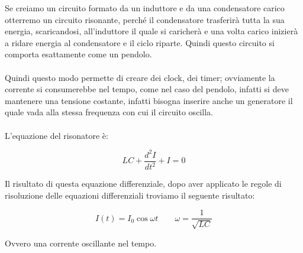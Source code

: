 Se creiamo un circuito formato da un induttore e da una condensatore carico otterremo un circuito risonante, perché il condensatore trasferirà tutta la sua energia, scaricandosi, all'induttore il quale si caricherà e una volta carico inizierà a ridare energia al condensatore e il ciclo riparte. Quindi questo circuito si comporta esattamente come un pendolo.
\paragraph{}
Quindi questo modo permette di creare dei clock, dei timer; ovviamente la corrente si consumerebbe nel tempo, come nel caso del pendolo, infatti si deve mantenere una tensione costante, infatti bisogna inserire anche un generatore il quale vada alla stessa frequenza con cui il circuito oscilla.

\paragraph{}
L'equazione del risonatore è:

\begin{equation}
    LC + \frac{d^2I}{dt^2} + I = 0
\end{equation}

Il risultato di questa equazione differenziale, dopo aver applicato le regole di risoluzione delle equazioni differenziali troviamo il seguente risultato:

\begin{equation}
    I(t) = I_0 \cos{\omega t}\qquad\omega = \frac{1}{\sqrt{LC}}
\end{equation}

Ovvero una corrente oscillante nel tempo.

